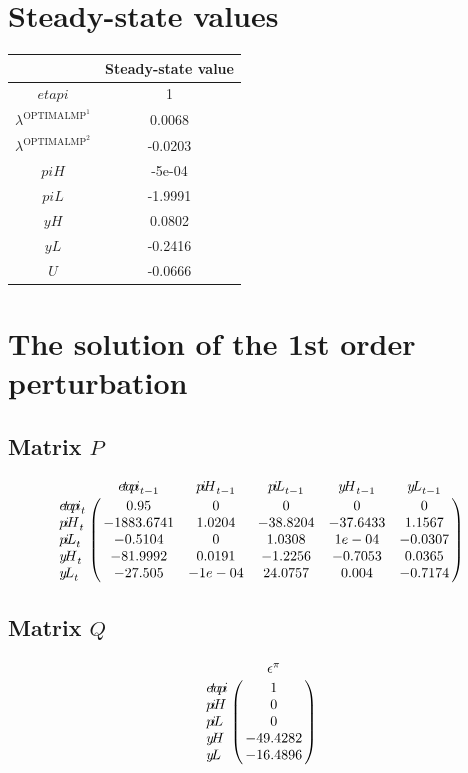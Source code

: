 

\section{Steady-state values}


\begin{tabular}{c|c|}
  & Steady-state value\\
\hline
${e\!t\!a\!p\!i}$ & 1 \\
$\lambda^{\mathrm{OPTIMALMP}^{\mathrm{1}}}$ & 0.0068 \\
$\lambda^{\mathrm{OPTIMALMP}^{\mathrm{2}}}$ & -0.0203 \\
${p\!i\!H}$ & -5e-04 \\
${p\!i\!L}$ & -1.9991 \\
${y\!H}$ & 0.0802 \\
${y\!L}$ & -0.2416 \\
$U$ & -0.0666 \\
\hline
\end{tabular}


\section{The solution of the 1st order perturbation}

\subsection*{Matrix $P$}

$$\bordermatrix{
~ & {e\!t\!a\!p\!i}_{t-1} & {p\!i\!H}_{t-1} & {p\!i\!L}_{t-1} & {y\!H}_{t-1} & {y\!L}_{t-1} \cr
{e\!t\!a\!p\!i}_{t} & 0.95 & 0 & 0 & 0 & 0 \cr
{p\!i\!H}_{t} & -1883.6741 & 1.0204 & -38.8204 & -37.6433 & 1.1567 \cr
{p\!i\!L}_{t} & -0.5104 & 0 & 1.0308 & 1e-04 & -0.0307 \cr
{y\!H}_{t} & -81.9992 & 0.0191 & -1.2256 & -0.7053 & 0.0365 \cr
{y\!L}_{t} & -27.505 & -1e-04 & 24.0757 & 0.004 & -0.7174 \cr
}$$

\subsection*{Matrix $Q$}

$$\bordermatrix{
~ & \epsilon^{\pi} \cr
{e\!t\!a\!p\!i} & 1 \cr
{p\!i\!H} & 0 \cr
{p\!i\!L} & 0 \cr
{y\!H} & -49.4282 \cr
{y\!L} & -16.4896 \cr
}$$

